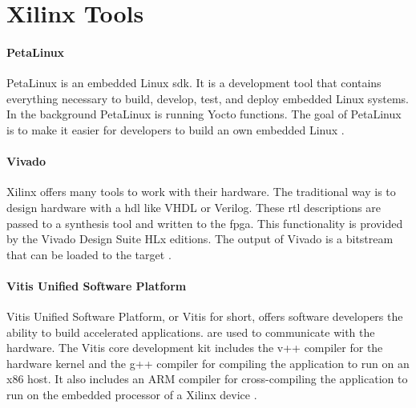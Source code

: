 \section{Xilinx Tools}
\label{sec:embedded_platform:xilinx_tools}

\paragraph{PetaLinux}
PetaLinux is an embedded Linux \acrfull{sdk}.
It is a development tool that contains everything necessary to build, develop, test, and deploy embedded Linux systems.
In the background PetaLinux is running Yocto functions.
The goal of PetaLinux is to make it easier for developers to build an own embedded Linux \cite{petalinux_user_guide}.

\paragraph{Vivado}
Xilinx offers many tools to work with their hardware.
The traditional way is to design hardware with a \acrfull{hdl} like VHDL or Verilog.
These \acrfull{rtl} descriptions are passed to a synthesis tool and written to the \acrshort{fpga}.
This functionality is provided by the Vivado Design Suite HLx editions.
The output of Vivado is a bitstream that can be loaded to the target \cite{vivado_user_guide}.

\paragraph{Vitis Unified Software Platform}
Vitis Unified Software Platform, or Vitis for short, offers software developers the ability to build accelerated applications.
 are used to communicate with the hardware.
The Vitis core development kit includes the v++ compiler for the hardware kernel and the g++ compiler for compiling the application to run on an x86 host.
It also includes an ARM compiler for cross-compiling the application to run on the embedded processor of a Xilinx device \cite{vitis_user_guide}.

